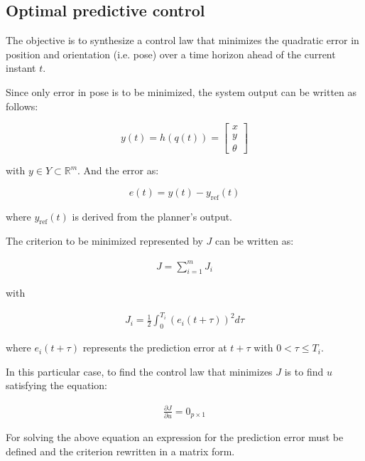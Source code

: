 \documentclass[letterpaper, 10 pt, conference]{ieeeconf}  %
\begin{document}

\subsection{Optimal predictive control}

The objective is to synthesize a control law that minimizes the quadratic error in position and orientation (i.e. pose) over a time horizon ahead of the current instant $t$.

Since only error in pose is to be minimized, the system output can be written as follows:

\[
y(t) = h(q(t)) = \left[\begin{array}{c}
x\\
y\\
\theta
\end{array}
\right]
\]

with ${y \in Y \subset \mathds{R}^m}$. And the error as:

\[
	e(t) =  y(t) - y_{\text{ref}}(t)
\]

where ${y_{\text{ref}}(t)}$ is derived from the planner's output.

The criterion to be minimized represented by $J$ can be written as:

\begin{align*}
J = \sum_{i=1}^m J_i 
\end{align*}

with

\begin{align*}
J_i = \frac{1}{2}\int_0^{T_i} (e_i(t+\tau))^2d\tau
\end{align*}

where ${e_i(t+\tau)}$ represents the prediction error at ${t+\tau}$ with ${0 < \tau \leq T_i}$.

In this particular case, to find the control law that minimizes $J$ is to find $u$ satisfying the equation:

\begin{align*}
\frac{\partial J}{\partial u} = 0_{p\times 1}
\end{align*}

For solving the above equation an expression for the prediction error must be defined and the criterion rewritten in a matrix form.

\end{document}
